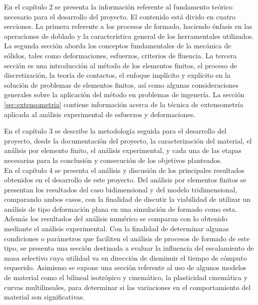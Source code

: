 En el capítulo 2 se presenta la información referente al fundamento teórico necesario para el 
desarrollo del proyecto. El contenido está divido en cuatro secciones. La primera referente 
a los procesos de formado, haciendo énfasis en las operaciones de doblado y la 
característica general de los herramentales utilizados. La segunda sección aborda 
los conceptos fundamentales de la mecánica de sólidos, tales como deformaciones, esfuerzos, 
criterios de fluencia. La tercera sección es una introducción al método de los elementos finitos, 
el proceso de discretización, la teoría de contactos, el enfoque implícito y explícito en 
la solución de problemas de elementos finitos, así como algunas consideraciones generales 
sobre la aplicación del método en problemas de ingenería. La sección \ref{sec:extensometria} 
contiene información acerca de la técnica de extensometría aplicada al análisis experimental 
de esfuerzos y deformaciones.

En el capítulo 3 se describe la metodología seguida para el desarrollo del proyecto, 
desde la documentación del proyecto, la caracterización del material, el análisis por 
elemento finito, el análisis experimental, y cada una de las etapas necesarias para 
la conclusión y consecución de los objetivos planteados.\\

En el capítulo 4 se presenta el análisis y discusión de los principales resultados 
obtenidos en el desarrollo de este proyecto. Del análisis por elementos finitos 
se presentan los resultados del caso bidimensional y del modelo tridimensional, comparando 
ambos casos, con la finalidad de discutir la viabilidad de utilizar un análisis de tipo 
deformación plana en una simulación de formado como esta. Además los resultados del 
análisis numérico se comparan con lo obtenido mediante el análisis experimental.
Con la finalidad de determinar algunas condiciones o parámetros que faciliten 
el análisis de procesos de formado de este tipo, se presenta una sección destinada 
a evaluar la influencia del escalamiento de masa selectivo cuya utilidad va en 
dirección de disminuir el tiempo de cómputo requerido. Asimismo se expone una sección 
referente al uso de algunos modelos de material como el bilineal isotrópico y cinemático, 
la plasticidad cinemática y curvas multilineales, para determinar si las variaciones 
en el comportamiento del material son significativas.\\

